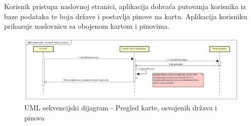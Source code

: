                 
                Korisnik pristupa naslovnoj stranici, aplikacija dohvaća putovanja korisnika iz baze podataka te boja države i postavlja pinove na kartu. Aplikacija korisniku prikazuje naslovnicu sa obojenom kartom i pinovima.
                \begin{figure}[H]
                	\includegraphics[scale=0.4]{slike/SD-pregledkarte.png} %
                	\centering
                	\caption{UML sekvencijski dijagram - Pregled karte, osvojenih država i pinova}
                			
                \end{figure}
                
